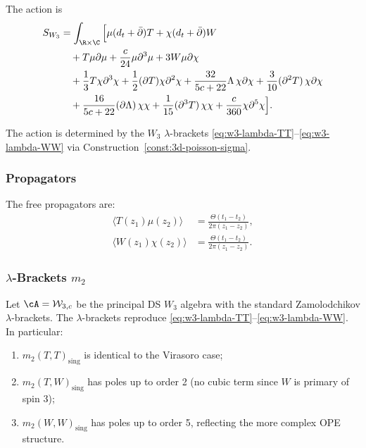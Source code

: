 The action is
\begin{align}
\label{eq:w3-action}
S_{W_3} &= \int_{\R \times \C} \Big[ \mu (d_t + \bar{\partial})T + \chi (d_t + \bar{\partial})W \notag\\
&\quad + T \mu \partial \mu + \frac{c}{24} \mu \partial^3 \mu + 3W \mu \partial \chi \notag\\
&\quad + \frac{1}{3}T \chi \partial^3 \chi + \frac{1}{2}(\partial T) \chi \partial^2 \chi + \frac{32}{5c+22}\Lambda\, \chi \partial \chi + \frac{3}{10}(\partial^2 T)\,\chi \partial \chi \notag\\
&\quad + \frac{16}{5c+22}(\partial\Lambda)\, \chi \chi + \frac{1}{15}(\partial^3 T)\,\chi \chi + \frac{c}{360} \chi \partial^5 \chi \Big].
\end{align}

The action is determined by the $W_3$ $\lambda$-brackets \eqref{eq:w3-lambda-TT}--\eqref{eq:w3-lambda-WW} via Construction~\ref{const:3d-poisson-sigma}.

\subsubsection{Propagators}

The free propagators are:
\begin{align}
\langle T(z_1) \mu(z_2) \rangle &= \frac{\Theta(t_1-t_2)}{2\pi(z_1-z_2)},\\
\langle W(z_1) \chi(z_2) \rangle &= \frac{\Theta(t_1-t_2)}{2\pi(z_1-z_2)}.
\end{align}

\subsubsection{$\lambda$-Brackets $m_2$}

\begin{proposition}
\label{prop:w3-m2}
Let\/ $\cA=\mathcal W_{3,c}$ be the principal DS $W_3$ algebra with
the standard Zamolodchikov $\lambda$-brackets.
The $\lambda$-brackets reproduce \eqref{eq:w3-lambda-TT}--\eqref{eq:w3-lambda-WW}. In particular:
\begin{enumerate}
\item $m_2(T,T)_{\text{sing}}$ is identical to the Virasoro case;
\item $m_2(T,W)_{\text{sing}}$ has poles up to order 2 (no cubic term since $W$ is primary of spin 3);
\item $m_2(W,W)_{\text{sing}}$ has poles up to order 5, reflecting the more complex OPE structure.
\end{enumerate}
\end{proposition}

